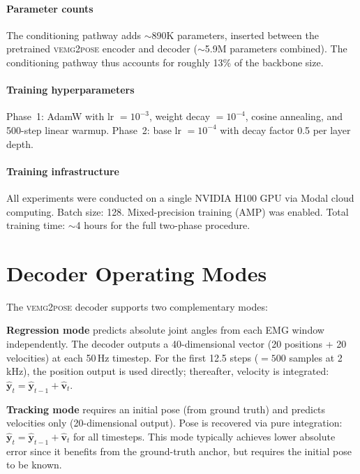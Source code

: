 \documentclass[conference]{IEEEtran}
\begin{document}
\paragraph{Parameter counts}
The conditioning pathway adds $\sim$890K parameters, inserted between the pretrained \textsc{vemg2pose} encoder and decoder ($\sim$5.9M parameters combined). The conditioning pathway thus accounts for roughly 13\% of the backbone size.

\paragraph{Training hyperparameters}
Phase~1: AdamW with lr $= 10^{-3}$, weight decay $= 10^{-4}$, cosine annealing, and 500-step linear warmup. Phase~2: base lr $= 10^{-4}$ with decay factor 0.5 per layer depth.

\paragraph{Training infrastructure}
All experiments were conducted on a single NVIDIA H100 GPU via Modal cloud computing. Batch size: 128. Mixed-precision training (AMP) was enabled. Total training time: $\sim$4 hours for the full two-phase procedure.

\section{Decoder Operating Modes}
\label{app:modes}

The \textsc{vemg2pose} decoder supports two complementary modes:

\textbf{Regression mode} predicts absolute joint angles from each EMG window independently. The decoder outputs a 40-dimensional vector (20 positions + 20 velocities) at each 50\,Hz timestep. For the first 12.5 steps ($= 500$ samples at 2\,kHz), the position output is used directly; thereafter, velocity is integrated: $\hat{\mathbf{y}}_t = \hat{\mathbf{y}}_{t-1} + \hat{\mathbf{v}}_t$.

\textbf{Tracking mode} requires an initial pose (from ground truth) and predicts velocities only (20-dimensional output). Pose is recovered via pure integration: $\hat{\mathbf{y}}_t = \hat{\mathbf{y}}_{t-1} + \hat{\mathbf{v}}_t$ for all timesteps. This mode typically achieves lower absolute error since it benefits from the ground-truth anchor, but requires the initial pose to be known.
\end{document}
